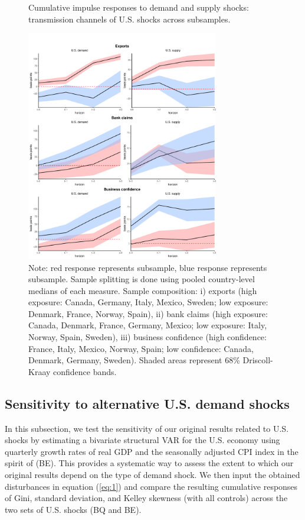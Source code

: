 \documentclass[12pt, a4paper]{article}
\begin{document}
\begin{figure}[H]
    \centering    
    \caption{Cumulative impulse responses to demand and supply shocks: transmission channels of U.S. shocks across subsamples.}    
    \label{fig:demand_supply_channels}
    \includegraphics[width=0.75\textwidth]{Figures/high_low_LP_channels_US.pdf}
   \centering \caption*{Note: red response represents  subsample, blue response represents  subsample. Sample splitting is done using pooled country-level medians of each measure. Sample composition: i) exports (high exposure: Canada, Germany, Italy, Mexico, Sweden; low exposure: Denmark, France, Norway, Spain), ii) bank claims (high exposure: Canada, Denmark, France, Germany, Mexico; low exposure: Italy, Norway, Spain, Sweden), iii) business confidence (high confidence: France, Italy, Mexico, Norway, Spain; low confidence: Canada, Denmark, Germany, Sweden). Shaded areas represent 68\% Driscoll-Kraay confidence bands.}
\end{figure}

\subsection{Sensitivity to alternative U.S. demand shocks}
In this subsection, we test the sensitivity of our original results related to U.S. shocks by estimating a bivariate structural VAR for the U.S. economy using quarterly growth rates of real GDP and the seasonally adjusted CPI index in the spirit of \textcite{bayoumi1992shocking} (BE). This provides a systematic way to assess the extent to which our original results depend on the type of demand shock. We then input the obtained disturbances in equation (\ref{eq:1}) and compare the resulting cumulative responses of Gini, standard deviation, and Kelley skewness (with all controls) across the two sets of U.S. shocks (BQ and BE).
\end{document}
